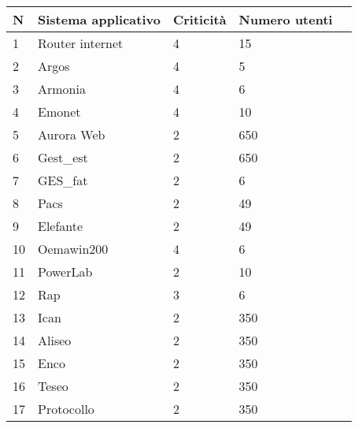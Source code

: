 	\begin{table}[h]
	\begin{tabular}{|l|l|l|l|l|}
		\hline
		\rowcolor[HTML]{EFEFEF} 
		\textbf{N} & \textbf{Sistema applicativo}  & \textbf{Criticità} & \textbf{Numero utenti} \\ \hline
		1  & Router internet	& 4		& 15		\\ \hline
		2  & Argos		& 4		& 5		\\ \hline
		3  & Armonia		& 4		& 6		\\ \hline
		4  & Emonet				& 4		& 10		\\ \hline
		5  & Aurora Web		& 2		& 650		\\ \hline
		6  & Gest\_est			& 2		& 650		\\ \hline
		7  & GES\_fat			& 2		& 6		\\ \hline
		8  & Pacs		& 2		& 49		\\ \hline
		9  & Elefante		& 2		& 49		\\ \hline
		10  & Oemawin200		& 4		& 6		\\ \hline
		11  & PowerLab						& 2		& 10		\\ \hline
		12  & Rap				& 3		& 6		\\ \hline
		13  & Ican		& 2		& 350 	\\ \hline
		14  & Aliseo			& 2		& 350 	\\ \hline
		15  & Enco		& 2		& 350 	\\ \hline
		16  & Teseo			& 2		& 350 	\\ \hline
		17  & Protocollo			& 2		& 350 	\\ \hline
	\end{tabular}
\end{table}

	